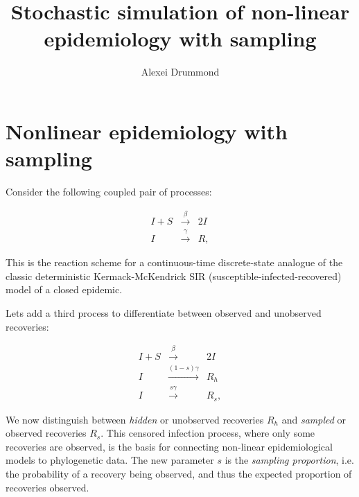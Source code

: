 \documentclass[11pt]{article}
\begin{document}
\title{Stochastic simulation of non-linear epidemiology with sampling}
\author{Alexei Drummond}
\date{}
\maketitle


\section{Nonlinear epidemiology with sampling}

Consider the following coupled pair of processes:

\begin{eqnarray}
I + S & \overset{\beta} \longrightarrow & 2I \nonumber \\
I & \overset{\gamma}\longrightarrow & R,
\end{eqnarray}

This is the reaction scheme for a continuous-time discrete-state analogue of the classic deterministic Kermack-McKendrick SIR (susceptible-infected-recovered) model of a closed epidemic.

Lets add a third process to differentiate between observed and unobserved recoveries:

\begin{eqnarray}
I + S & \overset{\beta} \longrightarrow & 2I \nonumber \\
I & \overset{(1-s)\gamma}\longrightarrow & R_h \\
I & \overset{s\gamma}\longrightarrow & R_s,
\end{eqnarray}

We now distinguish between {\it hidden} or unobserved recoveries $R_h$ and {\it sampled} or observed recoveries $R_s$. This censored infection process, where only some recoveries are observed, is the basis for connecting non-linear epidemiological models to phylogenetic data. The new parameter $s$ is the {\it sampling proportion}, i.e. the probability of a recovery being observed, and thus the expected proportion of recoveries observed.
\end{document}
